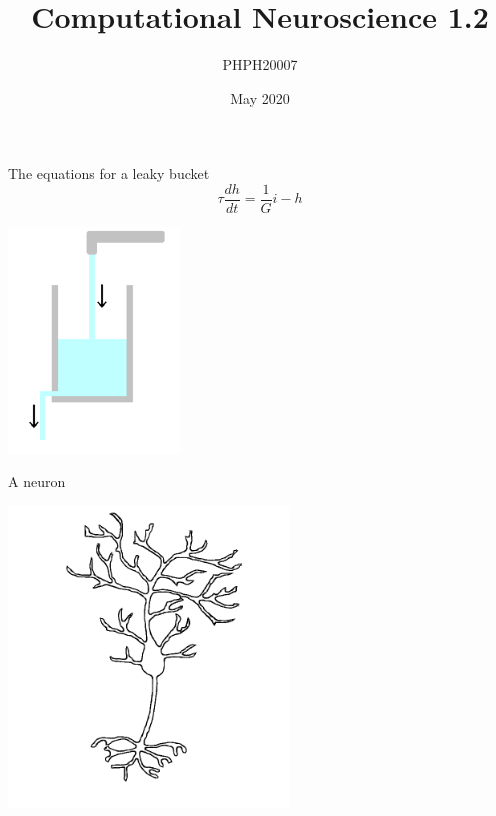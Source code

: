 \documentclass{beamer}
\title[Computational Neuroscience 1.2]{Computational Neuroscience 1.2}
\author{PHPH20007}
\institute{\texttt{github.com/conorhoughton/PHPH20007}}
\date{May 2020}
\newcommand{\crish}{\color{reddish}}
\newcommand{\cbla}{\color{black}}
\begin{document}
\maketitle

\begin{frame}{The equations for a leaky bucket}
  \crish
  $$\tau\frac{dh}{dt}=\frac{1}{G}i-h$$\cbla
  
  \begin{center}
    \includegraphics[height=6cm]{glass.png}
  \end{center}
\end{frame}


\begin{frame}{A neuron}
  \begin{center}
    \includegraphics[height=8cm]{neuron.png}
  \end{center}
\end{frame}
\end{document}
